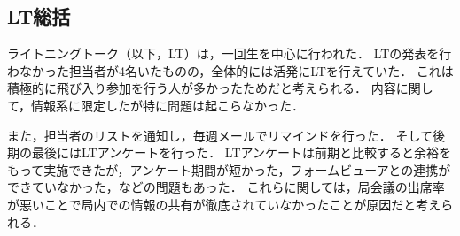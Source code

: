 \subsection*{LT総括}

ライトニングトーク（以下，LT）は，一回生を中心に行われた．
LTの発表を行わなかった担当者が4名いたものの，全体的には活発にLTを行えていた．
これは積極的に飛び入り参加を行う人が多かったためだと考えられる．
内容に関して，情報系に限定したが特に問題は起こらなかった．

また，担当者のリストを通知し，毎週メールでリマインドを行った．
そして後期の最後にはLTアンケートを行った．
LTアンケートは前期と比較すると余裕をもって実施できたが，アンケート期間が短かった，フォームビューアとの連携ができていなかった，などの問題もあった．
これらに関しては，局会議の出席率が悪いことで局内での情報の共有が徹底されていなかったことが原因だと考えられる．